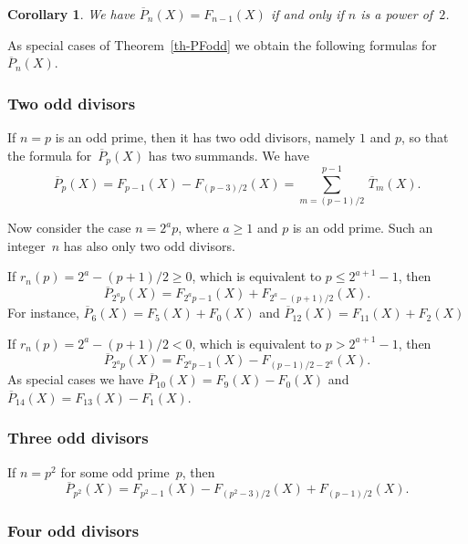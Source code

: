\documentclass[11pt, a4paper]{amsart}
\newtheorem{coro}[theorem]{Corollary}
\theoremstyle{definition}
\newcommand\Pg{\overline{P}}
\newcommand\TT{\overline{T}}
\numberwithin{equation}{section}
\begin{document}
\begin{coro}
We have $\Pg_n(X) = F_{n-1}(X)$ if and only if $n$ is a power of~$2$.
\end{coro}

As special cases of Theorem~\ref{th-PFodd} we obtain the following formulas for~$\Pg_n(X)$.

%
\subsubsection{Two odd divisors}

If $n = p$ is an odd prime, then it has two odd divisors, namely $1$ and $p$, so that
the formula for~$\Pg_p(X)$ has two summands. We have
\begin{equation*}
\Pg_p(X) = F_{p-1}(X) - F_{(p-3)/2}(X) = \sum_{m=(p-1)/2}^{p-1} \, \TT_m(X) .
\end{equation*}

Now consider the case $n = 2^a p$, where $a \geq 1$ and $p$ is an odd prime. 
Such an integer~$n$ has also only two odd divisors. 

If $r_n(p) = 2^a - (p+1)/2 \geq 0$, which is equivalent to $p \leq 2^{a+1} - 1$, then 
\begin{equation*}
\Pg_{2^a p}(X) = F_{2^a p-1}(X) + F_{2^a - (p+1)/2}(X)  .
\end{equation*}
For instance, $\Pg_{6}(X) = F_{5}(X) + F_{0}(X)$ and $\Pg_{12}(X) = F_{11}(X) + F_{2}(X)$

If $r_n(p) = 2^a - (p+1)/2 < 0$, which is equivalent to $p > 2^{a+1} - 1$, then 
\begin{equation*}
\Pg_{2^a p}(X) = F_{2^a p-1}(X) - F_{(p-1)/2 - 2^a}(X)  .
\end{equation*}
As special cases we have $\Pg_{10}(X) = F_{9}(X) - F_{0}(X)$ and $\Pg_{14}(X) = F_{13}(X) - F_{1}(X)$.

%
\subsubsection{Three odd divisors}

If $n = p^2$ for some odd prime~$p$, then
\begin{equation*}
\Pg_{p^2}(X) = F_{p^2-1}(X) - F_{(p^2 - 3)/2}(X) + F_{(p -1)/2}(X) .
\end{equation*}

%
\subsubsection{Four odd divisors}
\end{document}
